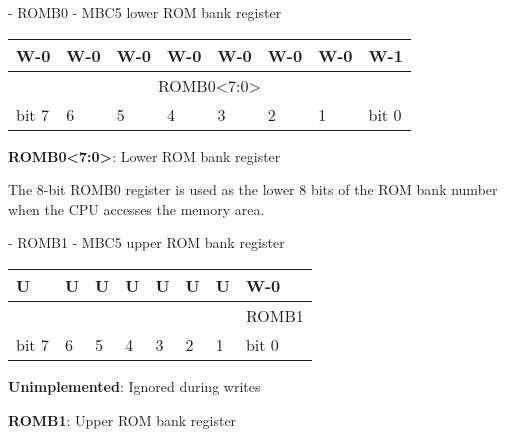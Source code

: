 \begin{register}[H]
  \caption{ - ROMB0 - MBC5 lower ROM bank register}

  {
    \ttfamily
    \begin{tabularx}{\textwidth}{|X|X|X|X|X|X|X|X|}
      \hline
      W-0 & W-0 & W-0 & W-0 & W-0 & W-0 & W-0 & W-1 \\
      \hline
      \multicolumn{8}{|c|}{ROMB0<7:0>} \\
      \hline
      bit 7 & 6 & 5 & 4 & 3 & 2 & 1 & bit 0 \\
      \hline
    \end{tabularx}
  }

  \begin{description}[leftmargin=5em, style=nextline]
    \item[bit 7-0]
      \textbf{ROMB0<7:0>}: Lower ROM bank register \\
  \end{description}
\end{register}

The 8-bit ROMB0 register is used as the lower 8 bits of the ROM bank number
when the CPU accesses the  memory area.

\begin{register}[H]
  \caption{ - ROMB1 - MBC5 upper ROM bank register}

  {
    \ttfamily
    \begin{tabularx}{\textwidth}{|X|X|X|X|X|X|X|X|}
      \hline
      U & U & U & U & U & U & U & W-0 \\
      \hline
      \cellcolor{LightGray} & \cellcolor{LightGray} & \cellcolor{LightGray} & \cellcolor{LightGray} & \cellcolor{LightGray} & \cellcolor{LightGray} & \cellcolor{LightGray} & ROMB1 \\
      \hline
      bit 7 & 6 & 5 & 4 & 3 & 2 & 1 & bit 0 \\
      \hline
    \end{tabularx}
  }

  \begin{description}[leftmargin=5em, style=nextline]
    \item[bit 7-1]
      \textbf{Unimplemented}: Ignored during writes
    \item[bit 0]
      \textbf{ROMB1}: Upper ROM bank register \\
  \end{description}
\end{register}

